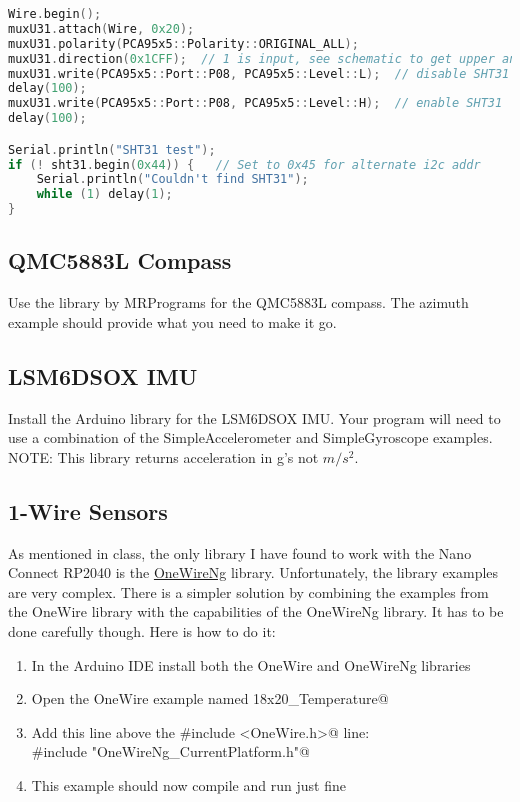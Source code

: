 \begin{lstlisting}[caption={This listing shows how to reset the SHT31.},
label={lst:sht31reset},language=C++]
Wire.begin();
muxU31.attach(Wire, 0x20);
muxU31.polarity(PCA95x5::Polarity::ORIGINAL_ALL);
muxU31.direction(0x1CFF);  // 1 is input, see schematic to get upper and lower bytes
muxU31.write(PCA95x5::Port::P08, PCA95x5::Level::L);  // disable SHT31
delay(100);
muxU31.write(PCA95x5::Port::P08, PCA95x5::Level::H);  // enable SHT31
delay(100);

Serial.println("SHT31 test");
if (! sht31.begin(0x44)) {   // Set to 0x45 for alternate i2c addr
    Serial.println("Couldn't find SHT31");
    while (1) delay(1);
}
\end{lstlisting}

\subsection{QMC5883L Compass}
Use the library by MRPrograms for the QMC5883L compass. The azimuth example 
should provide what you need to make it go.

\subsection{LSM6DSOX IMU}
Install the Arduino library for the LSM6DSOX IMU. Your program will need 
to use a combination of the SimpleAccelerometer and SimpleGyroscope examples.
NOTE: This library returns acceleration in g's not $m/s^2$.

\subsection{1-Wire Sensors}
As mentioned in class, the only library I have found to work with the Nano Connect 
RP2040 is the \href{https://github.com/pstolarz/OneWireNg}{OneWireNg} library. 
Unfortunately, the library examples are very complex. There is a simpler solution by 
combining the examples from the OneWire library with the capabilities of the OneWireNg 
library. It has to be done carefully though. Here is how to do it:
\begin{enumerate}
    \item In the Arduino IDE install both the OneWire and OneWireNg libraries
    \item Open the OneWire example named \lstinline@DS18x20_Temperature@ 
    \item Add this line above the \lstinline@#include <OneWire.h>@ line:\\
            \lstinline@#include "OneWireNg_CurrentPlatform.h"@ 
    \item This example should now compile and run just fine 
\end{enumerate}

